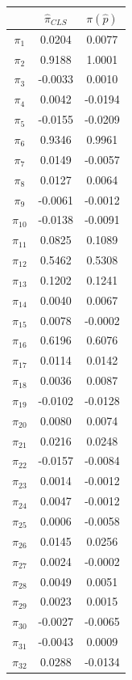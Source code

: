 \documentclass{article}
\begin{document}
\clearpage

\begin{table}
\begin{center}
\begin{tabular}{|c|cc|}
\hline
& $\hat{\pi}_{CLS}$ & $\pi(\hat{p})$\\ 
\hline
$\pi_{1} $  & 0.0204 & 0.0077\\
$\pi_{2} $  & 0.9188 & 1.0001\\
$\pi_{3} $  & -0.0033 & 0.0010\\
$\pi_{4} $  & 0.0042 & -0.0194\\
$\pi_{5} $  & -0.0155 & -0.0209\\
$\pi_{6} $  & 0.9346 & 0.9961\\
$\pi_{7} $  & 0.0149 & -0.0057\\
$\pi_{8} $  & 0.0127 & 0.0064\\
$\pi_{9} $  & -0.0061 & -0.0012\\
$\pi_{10} $  & -0.0138 & -0.0091\\
$\pi_{11} $  & 0.0825 & 0.1089\\
$\pi_{12} $  & 0.5462 & 0.5308\\
$\pi_{13} $  & 0.1202 & 0.1241\\
$\pi_{14} $  & 0.0040 & 0.0067\\
$\pi_{15} $  & 0.0078 & -0.0002\\
$\pi_{16} $  & 0.6196 & 0.6076\\
$\pi_{17} $  & 0.0114 & 0.0142\\
$\pi_{18} $  & 0.0036 & 0.0087\\
$\pi_{19} $  & -0.0102 & -0.0128\\
$\pi_{20} $  & 0.0080 & 0.0074\\
$\pi_{21} $  & 0.0216 & 0.0248\\
$\pi_{22} $  & -0.0157 & -0.0084\\
$\pi_{23} $  & 0.0014 & -0.0012\\
$\pi_{24} $  & 0.0047 & -0.0012\\
$\pi_{25} $  & 0.0006 & -0.0058\\
$\pi_{26} $  & 0.0145 & 0.0256\\
$\pi_{27} $  & 0.0024 & -0.0002\\
$\pi_{28} $  & 0.0049 & 0.0051\\
$\pi_{29} $  & 0.0023 & 0.0015\\
$\pi_{30} $  & -0.0027 & -0.0065\\
$\pi_{31} $  & -0.0043 & 0.0009\\
$\pi_{32} $  & 0.0288 & -0.0134\\


\end{tabular}
\end{center}
\end{table}
\end{document}
